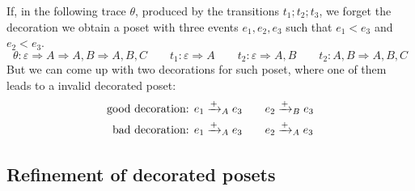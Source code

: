 
\begin{example}
  If, in the following trace $\theta$, produced by the transitions $t_1;t_2;t_3$, we forget the decoration we obtain a poset with three events $e_1,e_2,e_3$ such that $e_1<e_3$ and $e_2<e_3$.
  \[
  \theta:\varepsilon \Rightarrow A \Rightarrow A,B\Rightarrow A,B,C\qquad t_1: \varepsilon \Rightarrow A\qquad t_2: \varepsilon\Rightarrow A,B\qquad t_2: A,B\Rightarrow A,B,C
  \]
  But we can come up with two decorations for such poset, where one of them leads to a invalid decorated poset:
  \begin{align*}
  \text{good decoration: }&e_1\mathrel{\xrightarrow{+}}_A e_3\qquad e_2\mathrel{\xrightarrow{+}}_B e_3\\
  \text{bad decoration: }&e_1\mathrel{\xrightarrow{+}}_A e_3\qquad e_2\mathrel{\xrightarrow{+}}_A e_3
  \end{align*}
\end{example}

\subsection{Refinement of decorated posets}

